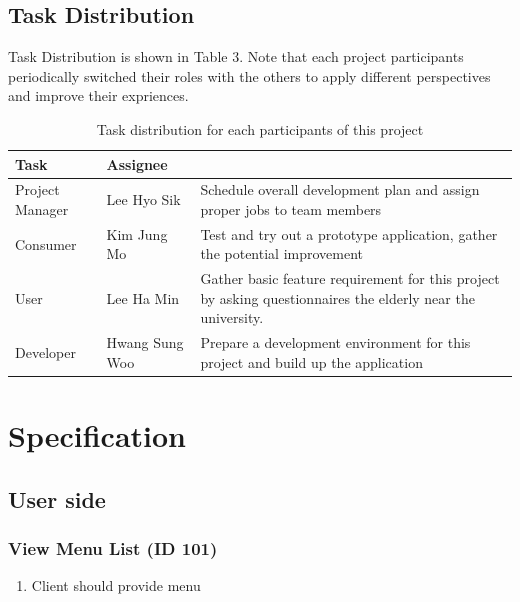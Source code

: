 \documentclass[conference,compsoc]{IEEEtran}
\begin{document}
\subsection{Task Distribution}

Task Distribution is shown in Table 3. Note that each project participants periodically switched their roles with the others to apply different perspectives and improve their expriences.

\begin{table}[ht!] \renewcommand\arraystretch{1.25}
  \begin{threeparttable}
      \caption{Task distribution  for each participants of this project%
      \label{tab:table1}}    %
      \begin{tabular}{@{}l l>{\raggedright\arraybackslash}p{4.7cm}@{}}
      \toprule
      \bfseries Task & \bfseries Assignee & \multicolumn{1}{l}{\bfseries Description} \\
      \midrule
      Project Manager & Lee Hyo Sik & Schedule overall development plan and assign proper jobs to team members \\ 
      Consumer & Kim Jung Mo & Test and try out a prototype application, gather the potential improvement \\ 
      User & Lee Ha Min & Gather basic feature requirement for this project by asking questionnaires the elderly near the university. \\ 
      Developer & Hwang Sung Woo & Prepare a development environment for this project and build up the application \\
      \bottomrule
      \end{tabular}
  \end{threeparttable}
\end{table}

\section{Specification}

\subsection{User side}

\subsubsection{View Menu List (ID 101)}
\begin{enumerate}
  \item Client should provide menu  
\end{enumerate}
\end{document}
